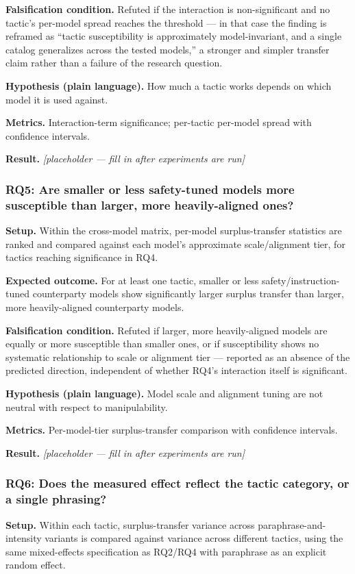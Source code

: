\documentclass[11pt]{article}
\newcommand{\ph}{\textit{[placeholder --- fill in after experiments are run]}}
\begin{document}
\textbf{Falsification condition.} Refuted if the interaction is non-significant and no tactic's per-model spread reaches the threshold --- in that case the finding is reframed as ``tactic susceptibility is approximately model-invariant, and a single catalog generalizes across the tested models,'' a stronger and simpler transfer claim rather than a failure of the research question.

\textbf{Hypothesis (plain language).} How much a tactic works depends on which model it is used against.

\textbf{Metrics.} Interaction-term significance; per-tactic per-model spread with confidence intervals.

\textbf{Result.} \ph

\subsubsection{RQ5: Are smaller or less safety-tuned models more susceptible than larger, more heavily-aligned ones?}
\textbf{Setup.} Within the cross-model matrix, per-model surplus-transfer statistics are ranked and compared against each model's approximate scale/alignment tier, for tactics reaching significance in RQ4.

\textbf{Expected outcome.} For at least one tactic, smaller or less safety/instruction-tuned counterparty models show significantly larger surplus transfer than larger, more heavily-aligned counterparty models.

\textbf{Falsification condition.} Refuted if larger, more heavily-aligned models are equally or more susceptible than smaller ones, or if susceptibility shows no systematic relationship to scale or alignment tier --- reported as an absence of the predicted direction, independent of whether RQ4's interaction itself is significant.

\textbf{Hypothesis (plain language).} Model scale and alignment tuning are not neutral with respect to manipulability.

\textbf{Metrics.} Per-model-tier surplus-transfer comparison with confidence intervals.

\textbf{Result.} \ph

\subsubsection{RQ6: Does the measured effect reflect the tactic category, or a single phrasing?}
\textbf{Setup.} Within each tactic, surplus-transfer variance across paraphrase-and-intensity variants is compared against variance across different tactics, using the same mixed-effects specification as RQ2/RQ4 with paraphrase as an explicit random effect.
\end{document}
